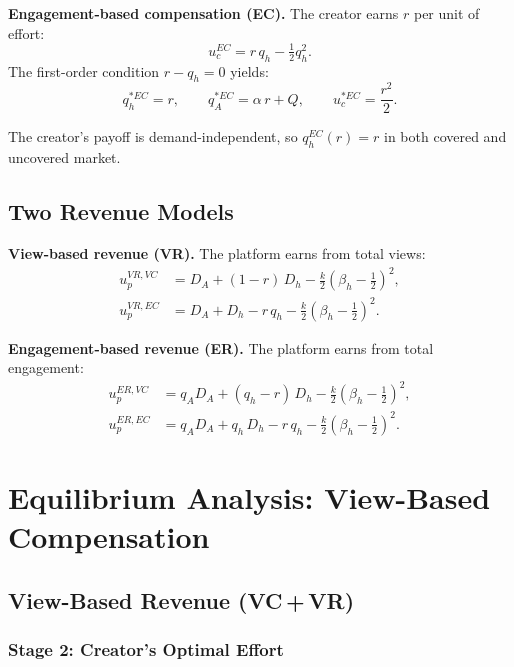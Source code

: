 \documentclass[mnsc,nonblindrev]{informs3_NoOR}
\begin{document}
 
\textbf{Engagement-based compensation (EC).} The creator earns $r$ per unit of effort:
\[
u_c^{EC} = r\,q_h - \tfrac{1}{2}q_h^2.
\]
The first-order condition $r - q_h = 0$ yields:
\begin{equation}\label{eq:effort-ec}
q_h^{*EC} = r, \qquad q_A^{*EC} = \alpha\,r + Q, \qquad u_c^{*EC} = \frac{r^2}{2}.
\end{equation}

The creator's payoff is demand-independent, so $q_h^{EC}(r) = r$ in both covered and uncovered market.
 
\subsection{Two Revenue Models}
 
\textbf{View-based revenue (VR).} The platform earns from total views:
\begin{align}
u_p^{VR,VC} &= D_A + (1-r)\,D_h - \tfrac{k}{2}(\beta_h - \tfrac{1}{2})^2, \label{eq:upVV}\\
u_p^{VR,EC} &= D_A + D_h - r\,q_h - \tfrac{k}{2}(\beta_h - \tfrac{1}{2})^2. \label{eq:upVE}
\end{align}
 
\textbf{Engagement-based revenue (ER).} The platform earns from total engagement:
\begin{align}
u_p^{ER,VC} &= q_A D_A + (q_h - r)\,D_h - \tfrac{k}{2}(\beta_h - \tfrac{1}{2})^2, \label{eq:upEV}\\
u_p^{ER,EC} &= q_A D_A + q_h\,D_h - r\,q_h - \tfrac{k}{2}(\beta_h - \tfrac{1}{2})^2. \label{eq:upEE}
\end{align}


\vfill
\pagebreak

\section{Equilibrium Analysis: View-Based Compensation}\label{sec:view}
 
\subsection{View-Based Revenue (VC\,+\,VR)}
 
\subsubsection{Stage 2: Creator's Optimal Effort}
 
\end{document}
